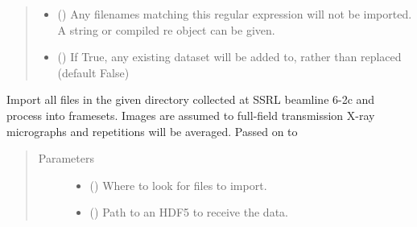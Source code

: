 \documentclass[letterpaper,10pt,english]{sphinxmanual}
\begin{document}
\begin{fulllineitems}
\begin{quote}
\begin{description}
\begin{itemize}
\item {} 
 (\sphinxstyleliteralemphasis{, }) \textendash{} Any filenames matching this regular expression will not be
imported. A string or compiled re object can be given.

\item {} 
 (\sphinxstyleliteralemphasis{, }) \textendash{} If True, any existing dataset will be added to, rather
than replaced (default False)

\end{itemize}

\end{description}\end{quote}

\end{fulllineitems}


\begin{fulllineitems}
\label{\detokenize{xanespy:xanespy.importers.import_ssrl_xanes_dir}}
Import all files in the given directory collected at SSRL beamline
6-2c and process into framesets. Images are assumed to full-field
transmission X-ray micrographs and repetitions will be
averaged. Passed on to 
\begin{quote}\begin{description}
\item[{Parameters}] \leavevmode\begin{itemize}
\item {} 
 () \textendash{} Where to look for files to import.

\item {} 
 () \textendash{} Path to an HDF5 to receive the data.

\end{itemize}

\end{description}\end{quote}

\end{fulllineitems}
\end{document}
